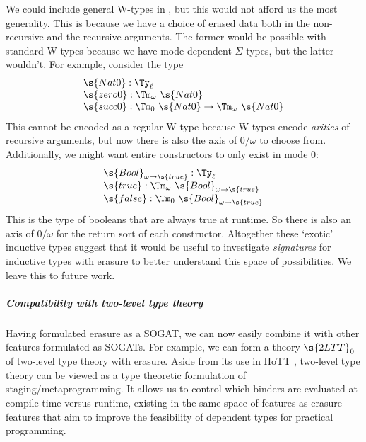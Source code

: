 \documentclass[a4paper,UKenglish,cleveref,autoref,thm-restate]{lipics-v2021}
\begin{document}
We could include general W-types \cite{Hugunin2021-ui} in \ZTT, but this would
not afford us the most generality. This is because we have a choice of erased
data both in the non-recursive and the recursive arguments. The former would be
possible with standard W-types because we have mode-dependent $\Sigma$ types,
but the latter wouldn't. For example, consider the type
\[
\begin{array}{l}
  \s{Nat0} : \Ty_\ell \\
  \s{zero0} : \Tm_\omega\ \s{Nat0} \\
  \s{succ0} : \Tm_0\ \s{Nat0} \to \Tm_\omega\ \s{Nat0} \\
\end{array}\]
This cannot be encoded as a regular W-type because W-types encode \emph{arities}
of recursive arguments, but now there is also the axis of $0/\omega$ to choose
from. Additionally, we might want entire constructors to only exist in mode 0:
\[
\begin{array}{l}
  \s{Bool}_{\omega\to \s{true}} : \Ty_\ell \\
  \s{true} : \Tm_\omega\ \s{Bool}_{\omega\to \s{true}} \\
  \s{false} : \Tm_0\ \s{Bool}_{\omega\to \s{true}} \\
\end{array}\]
This is the type of booleans that are always true at runtime. So there is also
an axis of $0/\omega$ for the return sort of each constructor. Altogether these
`exotic' inductive types suggest that it would be useful to investigate
\emph{signatures} for inductive types with erasure to better understand this
space of possibilities. We leave this to future work.

\subparagraph{Compatibility with two-level type theory}\label{ssub:2ltt}

Having formulated erasure as a SOGAT, we can now easily combine it with other
features formulated as SOGATs. For example, we can form a theory $\s{2LTT}_0$ of
two-level type theory \cite{Kovacs2022-rf} with erasure. Aside from its use in
HoTT \cite{Annenkov2023-vk}, two-level type theory can be viewed as a type
theoretic formulation of staging/metaprogramming. It allows us to control which
binders are evaluated at compile-time versus runtime, existing in the same space
of features as erasure -- features that aim to improve the feasibility of
dependent types for practical programming.
\end{document}
